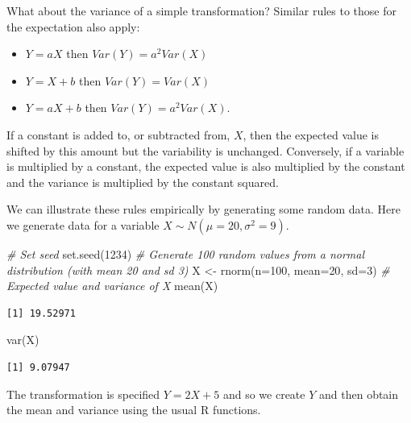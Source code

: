 \documentclass[
  oneside]{krantz}
\newenvironment{Shaded}{\begin{snugshade}}{\end{snugshade}}
\newcommand{\AttributeTok}[1]{\textcolor[rgb]{0.77,0.63,0.00}{#1}}
\newcommand{\CommentTok}[1]{\textcolor[rgb]{0.56,0.35,0.01}{\textit{#1}}}
\newcommand{\DecValTok}[1]{\textcolor[rgb]{0.00,0.00,0.81}{#1}}
\newcommand{\FunctionTok}[1]{\textcolor[rgb]{0.00,0.00,0.00}{#1}}
\newcommand{\NormalTok}[1]{#1}
\newcommand{\OtherTok}[1]{\textcolor[rgb]{0.56,0.35,0.01}{#1}}
\begin{document}
What about the variance of a simple transformation? Similar rules to those for the expectation also apply:

\begin{itemize}
\item
  \(Y = aX\) then \(Var(Y)= a^2Var(X)\)
\item
  \(Y = X + b\) then \(Var(Y)= Var(X)\)
\item
  \(Y = aX + b\) then \(Var(Y)= a^2Var(X)\).
\end{itemize}

If a constant is added to, or subtracted from, \(X\), then the expected value is shifted by this amount but the variability is unchanged. Conversely, if a variable is multiplied by a constant, the expected value is also multiplied by the constant and the variance is multiplied by the constant squared.

We can illustrate these rules empirically by generating some random data. Here we generate data for a variable \(X \sim N(\mu=20, \sigma^2=9)\).

\begin{Shaded}
\begin{Highlighting}[]
\CommentTok{\# Set seed}
\FunctionTok{set.seed}\NormalTok{(}\DecValTok{1234}\NormalTok{)}
\CommentTok{\# Generate 100 random values from a normal distribution (with mean 20 and sd 3)}
\NormalTok{X }\OtherTok{\textless{}{-}} \FunctionTok{rnorm}\NormalTok{(}\AttributeTok{n=}\DecValTok{100}\NormalTok{, }\AttributeTok{mean=}\DecValTok{20}\NormalTok{, }\AttributeTok{sd=}\DecValTok{3}\NormalTok{)}
\CommentTok{\# Expected value and variance of X}
\FunctionTok{mean}\NormalTok{(X)}
\end{Highlighting}
\end{Shaded}

\begin{verbatim}
[1] 19.52971
\end{verbatim}

\begin{Shaded}
\begin{Highlighting}[]
\FunctionTok{var}\NormalTok{(X)}
\end{Highlighting}
\end{Shaded}

\begin{verbatim}
[1] 9.07947
\end{verbatim}

The transformation is specified \(Y = 2X + 5\) and so we create \(Y\) and then obtain the mean and variance using the usual R functions.
\end{document}
